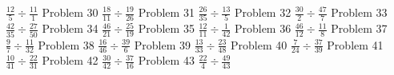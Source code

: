 \documentclass{article}
\begin{document}
$\displaystyle \frac{12}{5} \div \frac{11}{1}$
\newline
\hfill \break
Problem 30
\newline
\hfill \break
$\displaystyle \frac{18}{11} \div \frac{19}{26}$
\newline
\hfill \break
Problem 31
\newline
\hfill \break
$\displaystyle \frac{26}{35} \div \frac{13}{5}$
\newline
\hfill \break
Problem 32
\newline
\hfill \break
$\displaystyle \frac{30}{2} \div \frac{47}{7}$
\newline
\hfill \break
Problem 33
\newline
\hfill \break
$\displaystyle \frac{42}{35} \div \frac{27}{50}$
\newline
\hfill \break
Problem 34
\newline
\hfill \break
$\displaystyle \frac{46}{21} \div \frac{25}{19}$
\newline
\hfill \break
Problem 35
\newline
\hfill \break
$\displaystyle \frac{12}{11} \div \frac{1}{42}$
\newline
\hfill \break
Problem 36
\newline
\hfill \break
$\displaystyle \frac{46}{12} \div \frac{11}{8}$
\newline
\hfill \break
Problem 37
\newline
\hfill \break
$\displaystyle \frac{9}{7} \div \frac{11}{32}$
\newline
\hfill \break
Problem 38
\newline
\hfill \break
$\displaystyle \frac{16}{46} \div \frac{39}{6}$
\newline
\hfill \break
Problem 39
\newline
\hfill \break
$\displaystyle \frac{13}{33} \div \frac{23}{48}$
\newline
\hfill \break
Problem 40
\newline
\hfill \break
$\displaystyle \frac{7}{24} \div \frac{37}{39}$
\newline
\hfill \break
Problem 41
\newline
\hfill \break
$\displaystyle \frac{10}{41} \div \frac{22}{31}$
\newline
\hfill \break
Problem 42
\newline
\hfill \break
$\displaystyle \frac{30}{42} \div \frac{37}{16}$
\newline
\hfill \break
Problem 43
\newline
\hfill \break
$\displaystyle \frac{22}{4} \div \frac{49}{43}$
\end{document}
